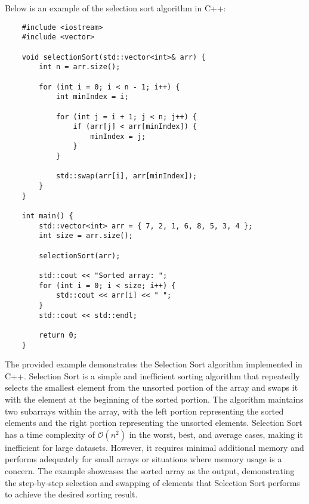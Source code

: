 \begin{solution}
    Below is an example of the selection sort algorithm in C++:

    \horizontalline

    \begin{verbatim}
    #include <iostream>
    #include <vector>
    
    void selectionSort(std::vector<int>& arr) {
        int n = arr.size();
    
        for (int i = 0; i < n - 1; i++) {
            int minIndex = i;
    
            for (int j = i + 1; j < n; j++) {
                if (arr[j] < arr[minIndex]) {
                    minIndex = j;
                }
            }
    
            std::swap(arr[i], arr[minIndex]);
        }
    }
    
    int main() {
        std::vector<int> arr = { 7, 2, 1, 6, 8, 5, 3, 4 };
        int size = arr.size();
    
        selectionSort(arr);
    
        std::cout << "Sorted array: ";
        for (int i = 0; i < size; i++) {
            std::cout << arr[i] << " ";
        }
        std::cout << std::endl;
    
        return 0;
    }
    \end{verbatim}

    \horizontalline

    The provided example demonstrates the Selection Sort algorithm implemented in C++. Selection Sort is a simple and inefficient sorting algorithm that repeatedly selects the smallest element from the unsorted portion of the array and swaps it with the element at the beginning of the sorted portion. The algorithm maintains two subarrays
    within the array, with the left portion representing the sorted elements and the right portion representing the unsorted elements. Selection Sort has a time complexity of $\mathcal{O}(n^2)$ in the worst, best, and average cases, making it inefficient for large datasets. However, it requires minimal additional memory and performs adequately
    for small arrays or situations where memory usage is a concern. The example showcases the sorted array as the output, demonstrating the step-by-step selection and swapping of elements that Selection Sort performs to achieve the desired sorting result.
\end{solution}

